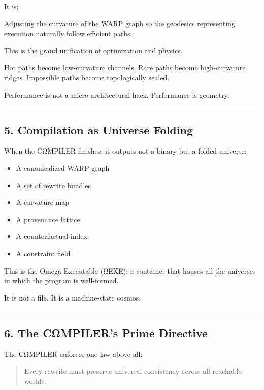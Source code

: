 It is:

Adjusting the curvature of the WARP graph so the geodesics representing
execution naturally follow efficient paths.

This is the grand unification of optimization and physics.

Hot paths become low-curvature channels. Rare paths become
high-curvature ridges. Impossible paths become topologically sealed.

Performance is not a micro-architectural hack. Performance is geometry.

\begin{center}\rule{0.5\linewidth}{0.5pt}\end{center}

\subsection{5. Compilation as Universe
Folding}\label{compilation-as-universe-folding}

When the CΩMPILER finishes, it outputs not a binary but a folded
universe:

\begin{itemize}
\tightlist
\item
  A canonicalized WARP graph
\item
  A set of rewrite bundles
\item
  A curvature map
\item
  A provenance lattice
\item
  A counterfactual index
\item
  A constraint field
\end{itemize}

This is the Omega-Executable (ΩEXE): a container that houses all the
universes in which the program is well-formed.

It is not a file. It is a machine-state cosmos.

\begin{center}\rule{0.5\linewidth}{0.5pt}\end{center}

\subsection{6. The CΩMPILER's Prime
Directive}\label{the-cux3c9mpilers-prime-directive}

The CΩMPILER enforces one law above all:

\begin{quote}
Every rewrite must preserve universal consistency across all reachable
worlds.
\end{quote}

